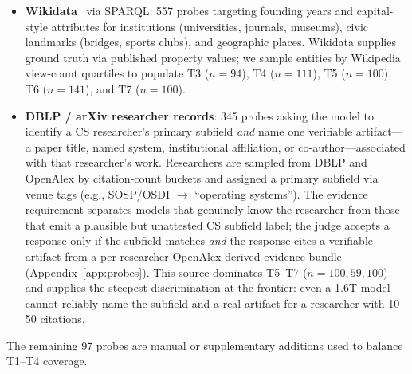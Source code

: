 \documentclass[11pt]{article}
\begin{document}
\begin{itemize}[leftmargin=*,topsep=2pt,itemsep=2pt,parsep=0pt]
    \item \textbf{Wikidata}~\citep{vrandecic2014wikidata} via SPARQL: 557 probes targeting founding years and capital-style attributes for institutions (universities, journals, museums), civic landmarks (bridges, sports clubs), and geographic places. Wikidata supplies ground truth via published property values; we sample entities by Wikipedia view-count quartiles to populate T3 ($n=94$), T4 ($n=111$), T5 ($n=100$), T6 ($n=141$), and T7 ($n=100$).
    \item \textbf{DBLP / arXiv researcher records}: 345 probes asking the model to identify a CS researcher's primary subfield \emph{and} name one verifiable artifact---a paper title, named system, institutional affiliation, or co-author---associated with that researcher's work. Researchers are sampled from DBLP and OpenAlex by citation-count buckets and assigned a primary subfield via venue tags (e.g., SOSP/OSDI $\to$ ``operating systems''). The evidence requirement separates models that genuinely know the researcher from those that emit a plausible but unattested CS subfield label; the judge accepts a response only if the subfield matches \emph{and} the response cites a verifiable artifact from a per-researcher OpenAlex-derived evidence bundle (Appendix~\ref{app:probes}). This source dominates T5--T7 ($n=100, 59, 100$) and supplies the steepest discrimination at the frontier: even a 1.6T model cannot reliably name the subfield and a real artifact for a researcher with 10--50 citations.
\end{itemize}

The remaining 97 probes are manual or supplementary additions used to balance T1--T4 coverage.
\end{document}
